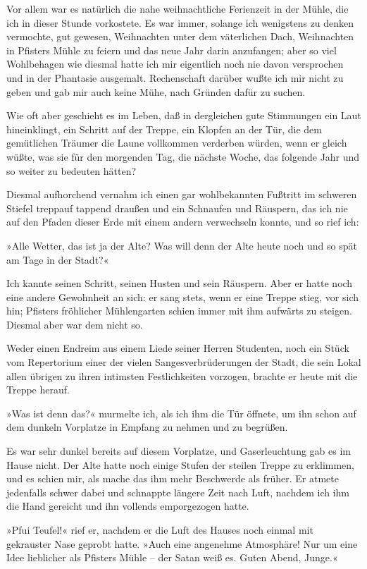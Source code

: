 Vor allem war es natürlich die nahe weihnachtliche Ferienzeit in
der Mühle, die ich in dieser Stunde vorkostete. Es war immer,
solange ich wenigstens zu denken vermochte, gut gewesen,
Weihnachten unter dem väterlichen Dach, Weihnachten in Pfisters
Mühle zu feiern und das neue Jahr darin anzufangen; aber so viel
Wohlbehagen wie diesmal hatte ich mir eigentlich noch nie davon
versprochen und in der Phantasie ausgemalt. Rechenschaft darüber
wußte ich mir nicht zu geben und gab mir auch keine Mühe, nach
Gründen dafür zu suchen.

Wie oft aber geschieht es im Leben, daß in dergleichen gute
Stimmungen ein Laut hineinklingt, ein Schritt auf der Treppe, ein
Klopfen an der Tür, die dem gemütlichen Träumer die Laune
vollkommen verderben würden, wenn er gleich wüßte, was sie für den
morgenden Tag, die nächste Woche, das folgende Jahr und so weiter
zu bedeuten hätten?

Diesmal aufhorchend vernahm ich einen gar wohlbekannten Fußtritt im
schweren Stiefel treppauf tappend draußen und ein Schnaufen und
Räuspern, das ich nie auf den Pfaden dieser Erde mit einem andern
verwechseln konnte, und so rief ich:

»Alle Wetter, das ist ja der Alte? Was will denn der Alte heute
noch und so spät am Tage in der Stadt?«

Ich kannte seinen Schritt, seinen Husten und sein Räuspern. Aber er
hatte noch eine andere Gewohnheit an sich: er sang stets, wenn er
eine Treppe stieg, vor sich hin; Pfisters fröhlicher Mühlengarten
schien immer mit ihm aufwärts zu steigen. Diesmal aber war dem
nicht so.

Weder einen Endreim aus einem Liede seiner Herren Studenten, noch
ein Stück vom Repertorium einer der vielen Sangesverbrüderungen der
Stadt, die sein Lokal allen übrigen zu ihren intimsten
Festlichkeiten vorzogen, brachte er heute mit die Treppe herauf.

»Was ist denn das?« murmelte ich, als ich ihm die Tür öffnete, um
ihn schon auf dem dunkeln Vorplatze in Empfang zu nehmen und zu
begrüßen.

Es war sehr dunkel bereits auf diesem Vorplatze, und Gaserleuchtung
gab es im Hause nicht. Der Alte hatte noch einige Stufen der
steilen Treppe zu erklimmen, und es schien mir, als mache das ihm
mehr Beschwerde als früher. Er atmete jedenfalls schwer dabei und
schnappte längere Zeit nach Luft, nachdem ich ihm die Hand gereicht
und ihn vollends emporgezogen hatte.

»Pfui Teufel!« rief er, nachdem er die Luft des Hauses noch einmal
mit gekrauster Nase geprobt hatte. »Auch eine angenehme Atmosphäre!
Nur um eine Idee lieblicher als Pfisters Mühle – der Satan weiß es.
Guten Abend, Junge.«

